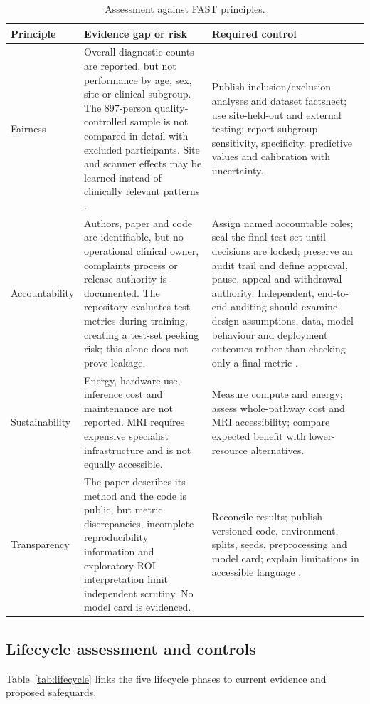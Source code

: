 \documentclass[11pt,a4paper]{article}
\let\cite\parencite
\begin{document}
\begin{table}[H]
\centering
\caption{Assessment against FAST principles.}
\label{tab:fast}
\small
\begin{tabularx}{\textwidth}{p{2.1cm}Y Y}
\toprule
\textbf{Principle} & \textbf{Evidence gap or risk} & \textbf{Required control}\\
\midrule
Fairness & Overall diagnostic counts are reported, but not performance by age, sex, site or clinical subgroup. The 897-person quality-controlled sample is not compared in detail with excluded participants. Site and scanner effects may be learned instead of clinically relevant patterns \cite{abraham2017,mehrabi2021}. & Publish inclusion/exclusion analyses and dataset factsheet; use site-held-out and external testing; report subgroup sensitivity, specificity, predictive values and calibration with uncertainty.\\
Accountability & Authors, paper and code are identifiable, but no operational clinical owner, complaints process or release authority is documented. The repository evaluates test metrics during training, creating a test-set peeking risk; this alone does not prove leakage. & Assign named accountable roles; seal the final test set until decisions are locked; preserve an audit trail and define approval, pause, appeal and withdrawal authority. Independent, end-to-end auditing should examine design assumptions, data, model behaviour and deployment outcomes rather than checking only a final metric \cite{raji2020}.\\
Sustainability & Energy, hardware use, inference cost and maintenance are not reported. MRI requires expensive specialist infrastructure and is not equally accessible. & Measure compute and energy; assess whole-pathway cost and MRI accessibility; compare expected benefit with lower-resource alternatives.\\
Transparency & The paper describes its method and the code is public, but metric discrepancies, incomplete reproducibility information and exploratory ROI interpretation limit independent scrutiny. No model card is evidenced. & Reconcile results; publish versioned code, environment, splits, seeds, preprocessing and model card; explain limitations in accessible language \cite{mitchell2019}.\\
\bottomrule
\end{tabularx}
\end{table}


\subsection{Lifecycle assessment and controls}
Table~\ref{tab:lifecycle} links the five lifecycle phases to current evidence and proposed safeguards.
\end{document}
